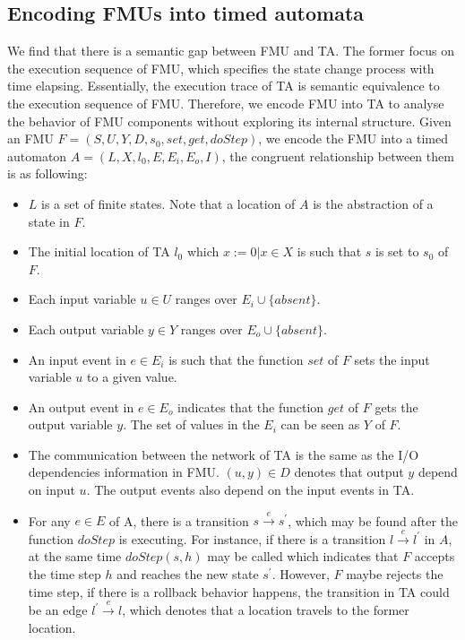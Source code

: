 \subsection{Encoding FMUs into timed automata}
We find that there is a semantic gap between FMU and TA. The former focus on the execution sequence of FMU, which specifies the state change process with time elapsing. Essentially, the execution trace of TA is semantic equivalence to the execution sequence of FMU. Therefore, we encode FMU into TA to analyse the behavior of FMU components without exploring its internal structure. 
Given an FMU $F=(S,U,Y,D,s_{0},set,get,doStep)$, we encode the FMU into a timed automaton $A = (L,X,l_{0},E,E_{i},E_{o},I)$, the congruent relationship between them is as following:
\begin{itemize}
\item
$L$ is a set of finite states. Note that a location of $A$ is the abstraction of a state in $F$.
\item
The initial location of TA $l_{0}$ which $x:=0 \vert x \in X$ is such that $s$ is set to $s_{0}$ of $F$. 
\item
Each input variable $u \in U$ ranges over $E_{i} \cup \{absent\}$.
\item
Each output variable $y \in Y$ ranges over $E_{o} \cup \{absent\}$.
\item
An input event in $e \in E_{i}$ is such that the function $set$ of $F$ sets the input variable $u$ to a given value. 
\item
An output event in $e \in E_{o}$ indicates that the function $get$ of $F$ gets the output variable $y$. The set of values in the $E_{i}$ can be seen as $Y$ of $F$.  
\item
The communication between the network of TA is the same as the I/O dependencies information in FMU. $(u,y) \in D$ denotes that output $y$ depend on input $u$. The output events also depend on the input events in TA.
\item
For any $e \in E$ of A, there is a transition $s \xrightarrow{e} s^{\prime}$, which may be found after the function $doStep$ is executing. For instance, if there is a transition $l \xrightarrow{e} l^{\prime}$ in $A$, at the same time $doStep(s,h)$ may be called which indicates that $F$ accepts the time step $h$ and reaches the new state $s^{\prime}$. However, $F$ maybe rejects the time step, if there is a rollback behavior happens, the transition in TA could be an edge $l^{\prime} \xrightarrow{e} l$, which denotes that a location travels to the former location.

\end{itemize}
